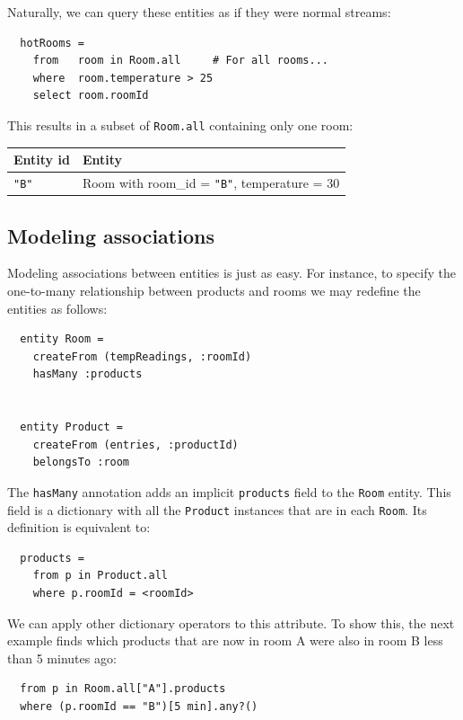 Naturally, we can query these entities as if they were normal streams:

\begin{lstlisting}
  hotRooms =
    from   room in Room.all		# For all rooms...
    where  room.temperature > 25
    select room.roomId
\end{lstlisting}

This results in a subset of \verb=Room.all= containing only one room:

\begin{tabular}{ |l|l| }
  \hline
  Entity id & Entity \\
  \hline
  \verb="B"= & Room with room\_id = \verb="B"=, temperature = 30 \\
  \hline
\end{tabular}

\subsection{Modeling associations}
\label{sub:associations}

Modeling associations between entities is just as easy. For instance,
to specify the one-to-many relationship between products and rooms we
may redefine the entities as follows:

\begin{lstlisting}
  entity Room =
    createFrom (tempReadings, :roomId)
    hasMany :products


  entity Product =
    createFrom (entries, :productId)
    belongsTo :room
\end{lstlisting}

The \verb=hasMany= annotation adds an implicit \verb=products= field
to the \verb=Room= entity. This field is a dictionary with all the
\verb=Product= instances that are in each \verb=Room=. Its definition
is equivalent to:

\begin{lstlisting}
  products =
    from p in Product.all
    where p.roomId = <roomId>
\end{lstlisting}

We can apply other dictionary operators to this attribute. To show
this, the next example finds which products that are now in room A
were also in room B less than 5 minutes ago:

\begin{lstlisting}
  from p in Room.all["A"].products
  where (p.roomId == "B")[5 min].any?()
\end{lstlisting}

